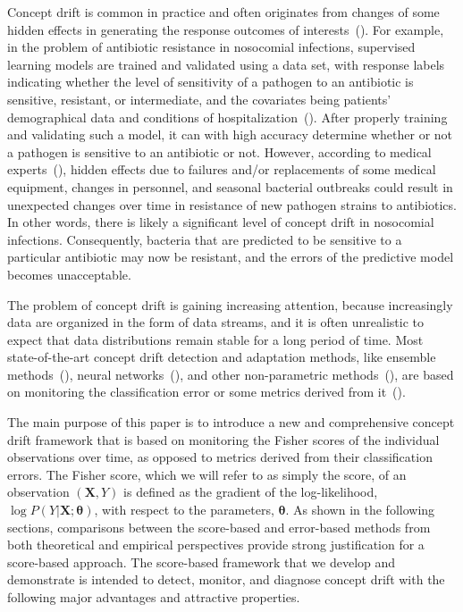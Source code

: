 \documentclass[twoside,11pt]{article}
\begin{document}
Concept drift is common in practice and often originates from changes of some hidden effects in generating the response outcomes of interests~(\cite{tsymbal2008dynamic,vzliobaite2012beating,widmer1996learning,kukar2003drifting,donoho2004early,carmona2010gnusmail,fong2015change,vzliobaite2016overview}). For example, in the problem of antibiotic resistance in nosocomial infections, supervised learning models are trained and validated using a data set, with response labels indicating whether the level of sensitivity of a pathogen to an antibiotic is sensitive, resistant, or intermediate, and the covariates being patients' demographical data and conditions of hospitalization~(\cite{pechenizkiy2005knowledge}). After properly training and validating such a model, it can with high accuracy determine whether or not a pathogen is sensitive to an antibiotic or not. However, according to medical experts~(\cite{kukar2003drifting}), hidden effects due to failures and/or replacements of some medical equipment, changes in personnel, and seasonal bacterial outbreaks could result in unexpected changes over time in resistance of new pathogen strains to antibiotics. In other words, there is likely a significant level of concept drift in nosocomial infections. Consequently, bacteria that are predicted to be sensitive to a particular antibiotic may now be resistant, and the errors of the predictive model becomes unacceptable. 

The problem of concept drift is gaining increasing attention, because increasingly data are organized in the form of data streams, and it is often unrealistic to expect that data distributions remain stable for a long period of time. Most state-of-the-art concept drift detection and adaptation methods, like ensemble methods~(\cite{wang2003mining}), neural networks~(\cite{calandra2012learning}), and other non-parametric methods~(\cite{bifet2007learning,frias2015online}), are based on monitoring the classification error or some metrics derived from it~(\cite{ross2012exponentially,gonccalves2014comparative,barros2018large}). 

The main purpose of this paper is to introduce a new and comprehensive concept drift framework that is based on monitoring the Fisher scores of the individual observations over time, as opposed to metrics derived from their classification errors. The Fisher score, which we will refer to as simply the score, of an observation $(\bm{X}, Y)$ is defined as the gradient of the log-likelihood, $\log{P(Y|\bm{X};\bm{\theta})}$, with respect to the parameters, $\bm{\theta}$. As shown in the following sections, comparisons between the score-based and error-based methods from both theoretical and empirical perspectives provide strong justification for a score-based approach. The score-based framework that we develop and demonstrate is intended to detect, monitor, and diagnose concept drift with the following major advantages and attractive properties.
\end{document}
